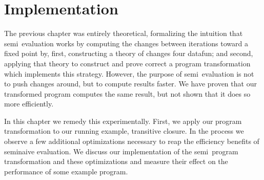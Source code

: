 \chapter{Implementation}


\newcommand\deep{\mathvar{dp}}

The previous chapter was entirely theoretical, formalizing the intuition that
semi\naive\ evaluation works by computing the changes between iterations toward
a fixed point by, first, constructing a theory of changes four datafun; and
second, applying that theory to construct and prove correct a program
transformation which implements this strategy. However, the purpose of
semi\naive\ evaluation is not to push changes around, but to compute results
faster. We have proven that our transformed program computes the same result,
but not shown that it does so more efficiently.

In this chapter we remedy this experimentally. First, we apply our program
transformation to our running example, transitive closure. In the process we
observe a few additional optimizations necessary to reap the efficiency
benefits of seminaive evaluation. We discuss our implementation of the
semi\naive\ program transformation and these optimizations and measure their
effect on the performance of some example program.



